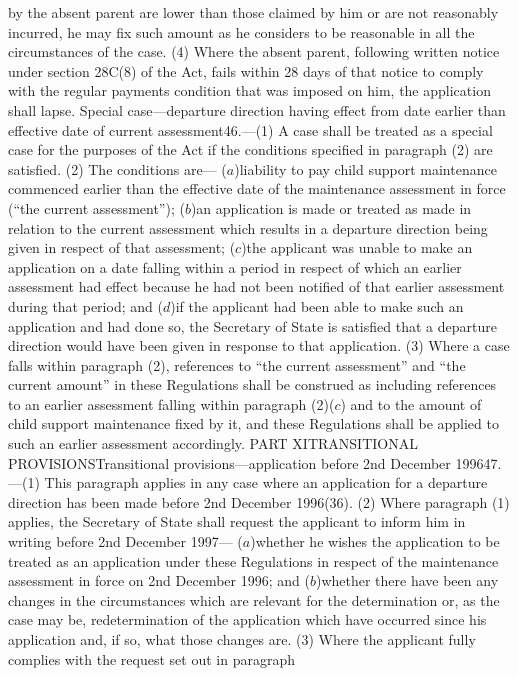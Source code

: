 \documentclass[a4paper]{article}
\begin{document}
by the absent parent are lower than those claimed by him or are not reasonably
incurred, he may fix such amount as he considers to be reasonable in all the
circumstances of the case.
(4) Where the absent parent, following written notice under section 28C(8) of
the Act, fails within 28 days of that notice to comply with the regular payments
condition that was imposed on him, the application shall lapse.
Special case—departure direction having effect from date earlier than effective
date of current assessment46.—(1) A case shall be treated as a special case for
the purposes of the Act if the conditions specified in paragraph (2) are
satisfied.
(2) The conditions are—
($a$)liability to pay child support maintenance commenced earlier than the
effective date of the maintenance assessment in force (“the current
assessment”);
($b$)an application is made or treated as made in relation to the current
assessment which results in a departure direction being given in respect of that
assessment;
($c$)the applicant was unable to make an application on a date falling within a
period in respect of which an earlier assessment had effect because he had not
been notified of that earlier assessment during that period; and
($d$)if the applicant had been able to make such an application and had done so,
the Secretary of State is satisfied that a departure direction would have been
given in response to that application.
(3) Where a case falls within paragraph (2), references to “the current
assessment” and “the current amount” in these Regulations shall be construed as
including references to an earlier assessment falling within paragraph (2)($c$)
and to the amount of child support maintenance fixed by it, and these
Regulations shall be applied to such an earlier assessment accordingly.
PART XITRANSITIONAL PROVISIONSTransitional provisions—application before 2nd
December 199647.—(1) This paragraph applies in any case where an application for
a departure direction has been made before 2nd December 1996(36).
(2) Where paragraph (1) applies, the Secretary of State shall request the
applicant to inform him in writing before 2nd December 1997—
($a$)whether he wishes the application to be treated as an application under these
Regulations in respect of the maintenance assessment in force on 2nd December
1996; and
($b$)whether there have been any changes in the circumstances which are relevant
for the determination or, as the case may be, redetermination of the application
which have occurred since his application and, if so, what those changes are.
(3) Where the applicant fully complies with the request set out in paragraph
\end{document}
